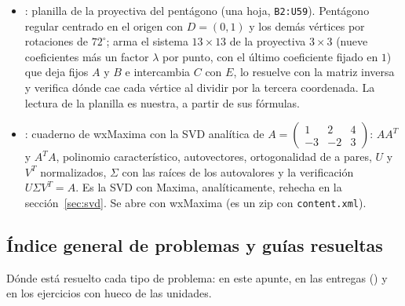 \begin{itemize}
  \item {}: planilla de la proyectiva del pentágono (una hoja,
  \texttt{B2:U59}). Pentágono regular centrado en el origen con \(D=(0,1)\) y los demás
  vértices por rotaciones de \(72^\circ\); arma el sistema \(13\times13\) de la proyectiva
  \(3\times3\) (nueve coeficientes más un factor \(\lambda\) por punto, con el último
  coeficiente fijado en \(1\)) que deja fijos \(A\) y \(B\) e intercambia \(C\) con \(E\),
  lo resuelve con la matriz inversa y verifica dónde cae cada vértice al dividir por la
  tercera coordenada. La lectura de la planilla es nuestra, a partir de sus fórmulas.
  \item {}: cuaderno de wxMaxima con la SVD analítica de
  \(A=\begin{pmatrix}1&2&4\\-3&-2&3\end{pmatrix}\): \(AA^T\) y \(A^TA\), polinomio
  característico, autovectores, ortogonalidad de a pares, \(U\) y \(V^T\) normalizados,
  \(\Sigma\) con las raíces de los autovalores y la verificación \(U\Sigma V^T=A\). Es la
  SVD con Maxima, analíticamente, rehecha en
  la sección~\ref{sec:svd}. Se abre con wxMaxima (es un zip con \texttt{content.xml}).
\end{itemize}

\subsection{Índice general de problemas y guías resueltas}

Dónde está resuelto cada tipo de problema: en este apunte, en las entregas
() y en los ejercicios con hueco de
las unidades.

